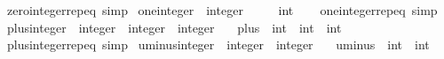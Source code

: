 \begin{isabellebody}
%
\isatagproof
\isacommand{{\isachardot}{\kern0pt}}\isamarkupfalse%
%
\endisatagproof
{\isafoldproof}%
%
\isadelimproof
\isanewline
%
\endisadelimproof
\isanewline
{}\isamarkupfalse%
\ zero{\isacharunderscore}{\kern0pt}integer{\isachardot}{\kern0pt}rep{\isacharunderscore}{\kern0pt}eq\ {\isacharbrackleft}{\kern0pt}simp{\isacharbrackright}{\kern0pt}\isanewline
\isanewline
{}\isamarkupfalse%
\ one{\isacharunderscore}{\kern0pt}integer\ {\isacharcolon}{\kern0pt}{\isacharcolon}{\kern0pt}\ integer\isanewline
\ \ \ {\isachardoublequoteopen}{}\ {\isacharcolon}{\kern0pt}{\isacharcolon}{\kern0pt}\ int{\isachardoublequoteclose}\isanewline
%
\isadelimproof
\ \ %
\endisadelimproof
%
\isatagproof
\isacommand{{\isachardot}{\kern0pt}}\isamarkupfalse%
%
\endisatagproof
{\isafoldproof}%
%
\isadelimproof
\isanewline
%
\endisadelimproof
\isanewline
{}\isamarkupfalse%
\ one{\isacharunderscore}{\kern0pt}integer{\isachardot}{\kern0pt}rep{\isacharunderscore}{\kern0pt}eq\ {\isacharbrackleft}{\kern0pt}simp{\isacharbrackright}{\kern0pt}\isanewline
\isanewline
{}\isamarkupfalse%
\ plus{\isacharunderscore}{\kern0pt}integer\ {\isacharcolon}{\kern0pt}{\isacharcolon}{\kern0pt}\ {\isachardoublequoteopen}integer\ {\isasymRightarrow}\ integer\ {\isasymRightarrow}\ integer{\isachardoublequoteclose}\isanewline
\ \ \ {\isachardoublequoteopen}plus\ {\isacharcolon}{\kern0pt}{\isacharcolon}{\kern0pt}\ int\ {\isasymRightarrow}\ int\ {\isasymRightarrow}\ int{\isachardoublequoteclose}\isanewline
%
\isadelimproof
\ \ %
\endisadelimproof
%
\isatagproof
\isacommand{{\isachardot}{\kern0pt}}\isamarkupfalse%
%
\endisatagproof
{\isafoldproof}%
%
\isadelimproof
\isanewline
%
\endisadelimproof
\isanewline
{}\isamarkupfalse%
\ plus{\isacharunderscore}{\kern0pt}integer{\isachardot}{\kern0pt}rep{\isacharunderscore}{\kern0pt}eq\ {\isacharbrackleft}{\kern0pt}simp{\isacharbrackright}{\kern0pt}\isanewline
\isanewline
{}\isamarkupfalse%
\ uminus{\isacharunderscore}{\kern0pt}integer\ {\isacharcolon}{\kern0pt}{\isacharcolon}{\kern0pt}\ {\isachardoublequoteopen}integer\ {\isasymRightarrow}\ integer{\isachardoublequoteclose}\isanewline
\ \ \ {\isachardoublequoteopen}uminus\ {\isacharcolon}{\kern0pt}{\isacharcolon}{\kern0pt}\ int\ {\isasymRightarrow}\ int{\isachardoublequoteclose}\isanewline
%
\isadelimproof
\ \ %
\endisadelimproof
%
\isatagproof
\isacommand{{\isachardot}{\kern0pt}}\isamarkupfalse%

\end{isabellebody}
